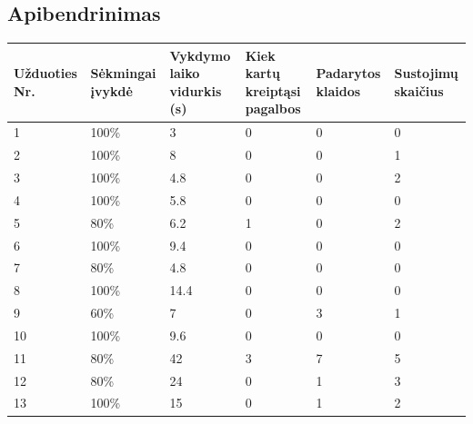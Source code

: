\documentclass[oneside]{VUMIFPSkursinis}
\begin{document}
\subsection{Apibendrinimas}
\begin{center}
	\begin{tabular}{ |p{1.6cm}| p{2cm} |p{3cm}|p{3cm}|p{3cm}| p{2.4cm} |}
\hline
Užduoties Nr.&Sėkmingai įvykdė&Vykdymo laiko vidurkis (s)&Kiek kartų kreiptąsi pagalbos&Padarytos klaidos&Sustojimų skaičius\\ \hline
1  &  100\% & 3 & 0 & 0 & 0\\ \hline
2  &  100\% & 8 & 0 & 0 & 1 \\ \hline
3  &  100\% & 4.8 & 0 & 0 & 2 \\ \hline
4  &  100\% &  5.8 & 0 & 0 & 0\\ \hline
5  &  80\% &  6.2 & 1 & 0 & 2 \\ \hline
6  &  100\% &  9.4 & 0 & 0 & 0 \\ \hline
7  &  80\% & 4.8 & 0 & 0 & 0 \\ \hline
8  &  100\% & 14.4 & 0 & 0 & 0 \\ \hline
9  &  60\% & 7 & 0 & 3 & 1\\ \hline
10 &  100\% & 9.6 & 0 & 0 & 0 \\ \hline
11 &  80\% &  42 & 3 & 7 & 5\\ \hline
12 &  80\% & 24 & 0 & 1 & 3\\ \hline
13 &  100\% & 15 & 0 & 1 & 2\\ \hline
\end{tabular}
\end{center}
\end{document}
